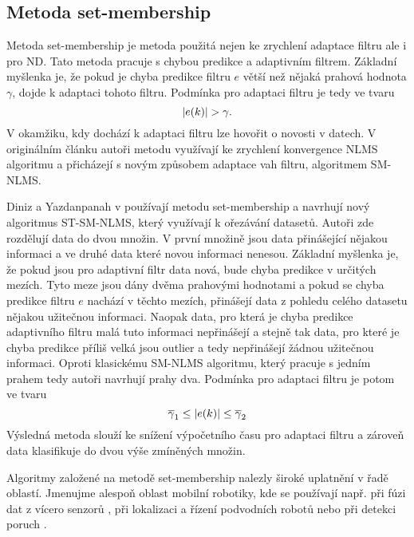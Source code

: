 \subsection{Metoda set-membership}
Metoda set-membership \cite{diniz0,set_member} je metoda použitá nejen ke zrychlení adaptace filtru ale i pro ND. Tato metoda pracuje s chybou predikce a adaptivním filtrem. Základní myšlenka je, že pokud je chyba predikce filtru $e$ větší než nějaká prahová hodnota $\gamma$, dojde k adaptaci tohoto filtru. Podmínka pro adaptaci filtru je tedy ve tvaru 
\begin{equation}
\lvert e(k)\rvert > \gamma.
\end{equation} V okamžiku, kdy dochází k adaptaci filtru lze hovořit o  novosti v datech. V originálním článku \cite{set_member} autoři metodu využívají ke zrychlení konvergence NLMS algoritmu a přicházejí s novým způsobem adaptace vah filtru, algoritmem SM-NLMS. 
\par 
Diniz a Yazdanpanah v \cite{diniz1} používají metodu set-membership a navrhují nový algoritmus ST-SM-NLMS, který využívají k ořezávání datasetů. Autoři zde rozdělují data do dvou množin. V první množině jsou data přinášející nějakou informaci a ve druhé data které novou informaci nenesou. Základní myšlenka je, že pokud jsou pro adaptivní filtr data nová, bude chyba predikce v určitých mezích.  Tyto meze jsou dány dvěma prahovými hodnotami a pokud se chyba predikce filtru $e$ nachází v těchto mezích, přinášejí data z pohledu celého datasetu nějakou užitečnou informaci. Naopak data, pro která je chyba predikce adaptivního filtru malá tuto informaci nepřinášejí a stejně tak data, pro které je chyba predikce příliš velká jsou outlier a tedy nepřinášejí žádnou užitečnou informaci. Oproti klasickému SM-NLMS algoritmu, který pracuje s jedním prahem tedy autoři navrhují prahy dva. Podmínka pro adaptaci filtru je potom ve tvaru
\begin{equation}
\overline{\gamma}_1 \leq \lvert e(k)\rvert \leq \overline{\gamma}_2
\end{equation}
Výsledná metoda slouží ke snížení výpočetního času pro adaptaci filtru a zároveň data klasifikuje do dvou výše zmíněných množin.
\par
Algoritmy založené na metodě set-membership nalezly široké uplatnění v řadě  oblastí. Jmenujme alespoň oblast mobilní robotiky, kde se používají např. při fúzi dat z vícero senzorů \cite{set_member_robot}, při lokalizaci a řízení podvodních robotů \cite{set_member_robot_voda} nebo při detekci poruch \cite{set_member_robot_chyba}. 
